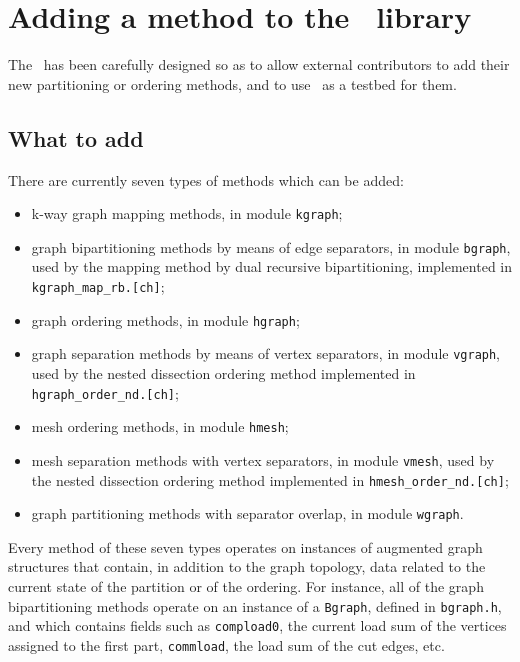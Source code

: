 
\section{Adding a method to the \libscotch\ library}
\label{sec-method}

The \libscotch\ has been carefully designed so as to allow external
contributors to add their new partitioning or ordering methods, and
to use \scotch\ as a testbed for them.

\subsection{What to add}

There are currently seven types of methods which can be added:
\begin{itemize}
\item
k-way graph mapping methods, in module \texttt{kgraph};
\item
graph bipartitioning methods by means of edge separators, in module
\texttt{bgraph}, used by the mapping method by dual recursive
bipartitioning, implemented in \texttt{kgraph\_\lbt map\_\lbt rb.[ch]};
\item
graph ordering methods, in module \texttt{hgraph};
\item
graph separation methods by means of vertex separators, in module
\texttt{vgraph}, used by the nested dissection ordering method
implemented in \texttt{hgraph\_\lbt order\_\lbt nd.[ch]};
\item
mesh ordering methods, in module \texttt{hmesh};
\item
mesh separation methods with vertex separators, in module
\texttt{vmesh}, used by the nested dissection ordering method
implemented in \texttt{hmesh\_\lbt order\_\lbt nd.[ch]};
\item
graph partitioning methods with separator overlap, in module
\texttt{wgraph}.
\end{itemize}
Every method of these seven types operates on instances of augmented
graph structures that contain, in addition to the graph topology,
data related to the current state of the partition or of the
ordering. For instance, all of the graph bipartitioning methods
operate on an instance of a \texttt{Bgraph}, defined in \texttt{bgraph.h},
and which contains fields such as \texttt{compload0}, the current load
sum of the vertices assigned to the first part, \texttt{commload}, the
load sum of the cut edges, etc.

